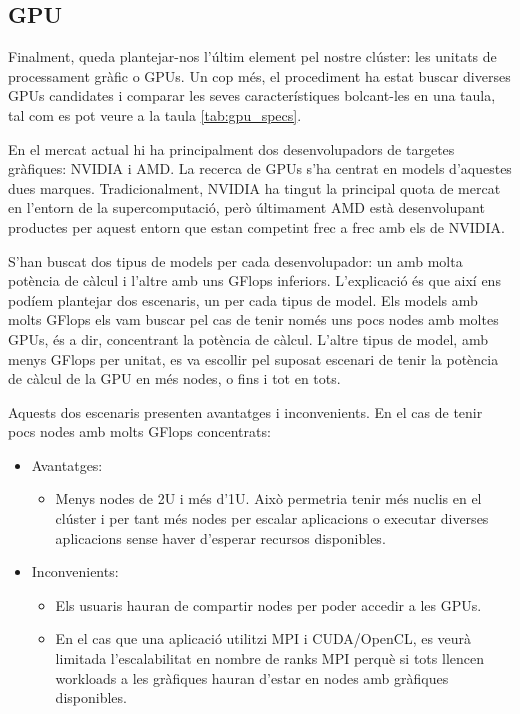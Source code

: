 \subsection{GPU}

Finalment, queda plantejar-nos l'últim element pel nostre clúster: les unitats de processament gràfic o GPUs. Un cop més, el procediment ha estat buscar diverses GPUs candidates i comparar les seves característiques bolcant-les en una taula, tal com es pot veure a la taula \ref{tab:gpu_specs}.



En el mercat actual hi ha principalment dos desenvolupadors de targetes gràfiques: NVIDIA i AMD. La recerca de GPUs s'ha centrat en models d'aquestes dues marques. Tradicionalment, NVIDIA ha tingut la principal quota de mercat en l'entorn de la supercomputació, però últimament AMD està desenvolupant productes per aquest entorn que estan competint frec a frec amb els de NVIDIA.

S'han buscat dos tipus de models per cada desenvolupador: un amb molta potència de càlcul i l'altre amb uns GFlops inferiors. L'explicació és que així ens podíem plantejar dos escenaris, un per cada tipus de model. 
Els models amb molts GFlops els vam buscar pel cas de tenir només uns pocs nodes amb moltes GPUs, és a dir, concentrant la potència de càlcul.
L'altre tipus de model, amb menys GFlops per unitat, es va escollir pel suposat escenari de tenir la potència de càlcul de la GPU en més nodes, o fins i tot en tots.

Aquests dos escenaris presenten avantatges i inconvenients. En el cas de tenir pocs nodes amb molts GFlops concentrats:
\begin{itemize}
    \item Avantatges:
    \begin{itemize}
        \item Menys nodes de 2U i més d'1U. Això permetria tenir més nuclis en el clúster i per tant més nodes per escalar aplicacions o executar diverses aplicacions sense haver d'esperar recursos disponibles.
    \end{itemize}
    \item Inconvenients:
    \begin{itemize}
        \item Els usuaris hauran de compartir nodes per poder accedir a les GPUs. 
        \item En el cas que una aplicació utilitzi MPI i CUDA/OpenCL, es veurà limitada l'escalabilitat en nombre de ranks MPI perquè si tots llencen workloads a les gràfiques hauran d'estar en nodes amb gràfiques disponibles.
    \end{itemize}
\end{itemize}

